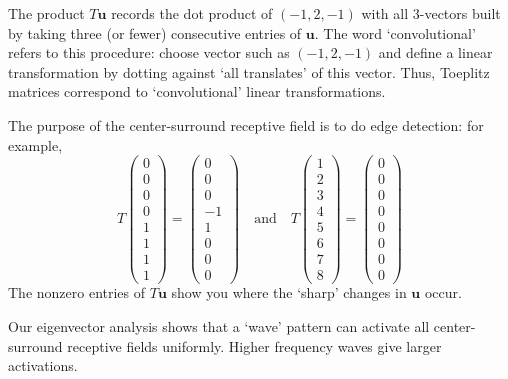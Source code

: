 \documentclass[10pt]{amsart}
\theoremstyle{mythm}
\theoremstyle{definition}
\theoremstyle{myrmk}
\begin{document}
\begin{itemize}
		The product $T\bm{u}$ records the dot product of $(-1, 2, -1)$ with all $3$-vectors built by taking three (or fewer) consecutive entries of $\bm{u}$. The word `convolutional' refers to this procedure: choose vector such as $(-1, 2, -1)$ and define a linear transformation by dotting against `all translates' of this vector. Thus, Toeplitz matrices correspond to `convolutional' linear transformations. 
		
		The purpose of the center-surround receptive field is to do edge detection: for example, 
		\[
			T \begin{pmatrix}
			0 \\ 0 \\ 0 \\ 0 \\ 1 \\ 1 \\ 1 \\ 1
			\end{pmatrix} = \begin{pmatrix}
			0 \\ 0 \\ 0 \\ -1 \\ 1 \\ 0 \\ 0 \\ 0
			\end{pmatrix} \quad \text{and} \quad T \begin{pmatrix}
			1 \\ 2 \\ 3 \\ 4 \\ 5 \\ 6 \\ 7 \\ 8
			\end{pmatrix} = \begin{pmatrix}
			0 \\ 0 \\ 0 \\ 0 \\ 0 \\ 0 \\ 0 \\ 0 
			\end{pmatrix}
		\]
		The nonzero entries of $T\bm{u}$ show you where the `sharp' changes in $\bm{u}$ occur. 
		
		Our eigenvector analysis shows that a `wave' pattern can activate all center-surround receptive fields uniformly. Higher frequency waves give larger activations. 
	\end{itemize}
	
	
	
	
	
	
	
\end{document}
